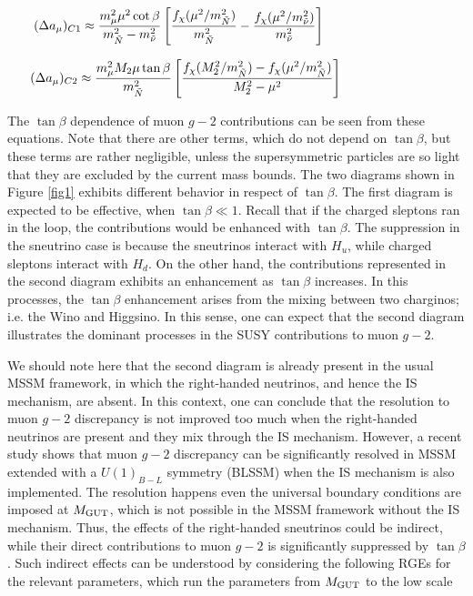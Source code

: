 \documentclass[12pt]{article}
\newcommand{\mgut}{M_{{\rm GUT}}}
\begin{document}
\begin{equation}\hspace{-3.2cm}
(\Delta a_{\mu})_{C1}\approx \frac{m_{\mu}^{2}\mu^{2}\cot\beta}{m^{2}_{\tilde{N}}-m^{2}_{\tilde{\nu}}} \left[  \frac{f_{\chi}(\mu^{2}/m^{2}_{\tilde{N}})}{m^{2}_{\tilde{N}}} -\frac{f_{\chi}(\mu^{2}/m^{2}_{\tilde{\nu}})}{m^{2}_{\tilde{\nu}}}  \right]
\label{aC1}
\end{equation}

\begin{equation}\hspace{-2.8cm}
(\Delta a_{\mu})_{C2}\approx \frac{m^{2}_{\mu}M_{2}\mu\tan\beta}{m^{2}_{\tilde{N}}}  \left[ \frac{f_{\chi}(M_{2}^{2}/m^{2}_{\tilde{N}})-f_{\chi}(\mu^{2}/m^{2}_{\tilde{N}})}{M_{2}^{2}-\mu^{2}}   \right]
\label{aC2}
\end{equation}

The $\tan\beta$ dependence of muon $g-2$ contributions can be seen from these equations. Note that there are other terms, which do not depend on $\tan\beta$, but these terms are rather negligible, unless the supersymmetric particles are so light that they are excluded by the current mass bounds. The two diagrams shown in Figure \ref{fig1} exhibits different behavior in respect of $\tan\beta$. The first diagram is expected to be effective, when $\tan\beta \ll 1$. Recall that if the charged sleptons ran in the loop, the contributions would be enhanced with $\tan\beta$. The suppression in the sneutrino case is because the sneutrinos interact with $H_{u}$, while charged sleptons interact with $H_{d}$. On the other hand, the contributions represented in the second diagram exhibits an enhancement as $\tan\beta$ increases. In this processes, the $\tan\beta$ enhancement arises from the mixing between two charginos; i.e. the Wino and Higgsino. In this sense, one can expect that the second diagram illustrates the dominant processes in the SUSY contributions to muon $g-2$. 

We should note here that the second diagram is already present in the usual MSSM framework, in which the right-handed neutrinos, and hence the IS mechanism, are absent. In this context, one can conclude that the resolution to muon $g-2$ discrepancy is not improved too much when the right-handed neutrinos are present and they mix through the IS mechanism. However, a recent study shows that muon $g-2$ discrepancy can be significantly resolved in MSSM extended with a $U(1)_{B-L}$ symmetry (BLSSM) \cite{Khalil:2015wua} when the IS mechanism is also implemented. The resolution happens even the universal boundary conditions are imposed at $\mgut$, which is not possible in the MSSM framework without the IS mechanism. Thus, the effects of the right-handed sneutrinos could be indirect, while their direct contributions to muon $g-2$ is significantly suppressed by $\tan\beta$. Such indirect effects can be understood by considering the following RGEs for the relevant parameters, which run the parameters from $\mgut$ to the low scale
\end{document}

